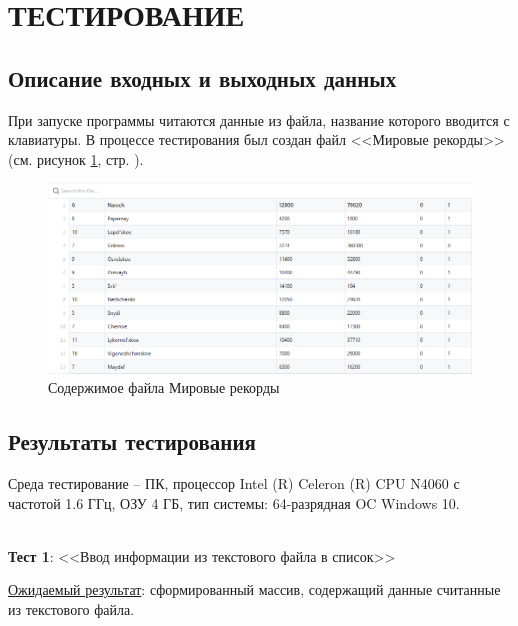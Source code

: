 \newpage

\section{ТЕСТИРОВАНИЕ}

\subsection{Описание входных и выходных данных}

При запуске программы читаются данные из файла, название которого вводится с клавиатуры. В процессе тестирования был создан файл <<Мировые рекорды>> (см. рисунок \ref{fig:data_tsv_github}, стр. \pageref{fig:data_tsv_github}).

\begin{figure}[!htp]
    \begin{center}
        \includegraphics[width=14cm]{_input/tests/data-tsv-github.png}
    \end{center}
    \caption{Содержимое файла Мировые рекорды \label{fig:data_tsv_github}}
\end{figure}

\subsection{Результаты тестирования}

Среда тестирование – ПК, процессор Intel (R) Celeron (R) CPU N4060 с частотой 1.6 ГГц, ОЗУ 4 ГБ, тип системы: 64-разрядная OC Windows 10.

\hspace{0pt}\\



\textbf{Тест 1}: <<Ввод информации из текстового файла в список>>

\underline{Ожидаемый результат}: сформированный массив, содержащий данные считанные из текстового файла.

